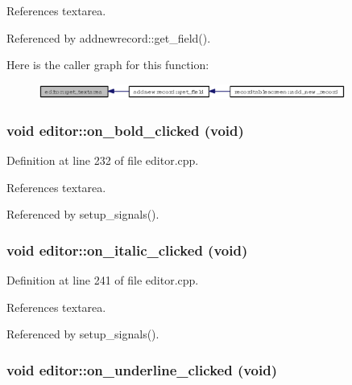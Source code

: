 References textarea.

Referenced by addnewrecord::get\_\-field().

Here is the caller graph for this function:\begin{figure}[H]
\begin{center}
\leavevmode
\includegraphics[width=286pt]{classeditor_70e34d0e46bb865b58303fe86e6bfea6_icgraph}
\end{center}
\end{figure}
\subsubsection{\setlength{\rightskip}{0pt plus 5cm}void editor::on\_\-bold\_\-clicked (void)\hspace{0.3cm}{\tt  [private, slot]}}\label{classeditor_4051836a755e85274e7bbf9899ae9623}




Definition at line 232 of file editor.cpp.

References textarea.

Referenced by setup\_\-signals().
\subsubsection{\setlength{\rightskip}{0pt plus 5cm}void editor::on\_\-italic\_\-clicked (void)\hspace{0.3cm}{\tt  [private, slot]}}\label{classeditor_f755873ab14fc7493a40ac25f71bd1ff}




Definition at line 241 of file editor.cpp.

References textarea.

Referenced by setup\_\-signals().
\subsubsection{\setlength{\rightskip}{0pt plus 5cm}void editor::on\_\-underline\_\-clicked (void)\hspace{0.3cm}{\tt  [private, slot]}}\label{classeditor_91aac348722136b605a5811b759786be}




